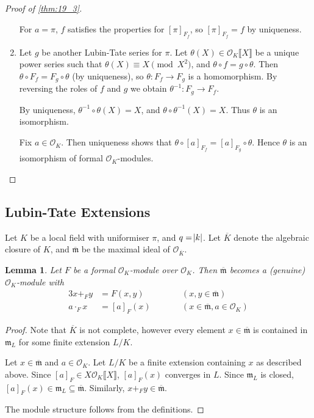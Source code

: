 \documentclass[11pt]{article}
\theoremstyle{definition}
\theoremstyle{plain}
\newtheorem{lemma}[definition]{Lemma}
\theoremstyle{remark}
\newcommand{\cO}{\mathcal{O}}
\newcommand{\fm}{\mathfrak{m}}
\begin{document}
\begin{proof}[Proof of \autoref{thm:19_3}]
\begin{enumerate}
            For $a = \pi$, $f$ satisfies the properties for $[\pi]_{F_f}$, so $[\pi]_{F_f} = f$ by uniqueness.

        \item Let $g$ be another Lubin-Tate series for $\pi$. Let $\theta(X) \in \cO_K\llbracket X \rrbracket$ be a unique power series such that $\theta(X) \equiv X \pmod{X^2}$, and $\theta \circ f = g \circ \theta$. Then $\theta \circ F_f = F_g \circ \theta$ (by uniqueness), so $\theta : F_f \to F_g$ is a homomorphism. By reversing the roles of $f$ and $g$ we obtain $\theta^{-1} : F_g \to F_f$.

            By uniqueness, $\theta^{-1} \circ \theta(X) = X$, and $\theta \circ \theta^{-1}(X) = X$. Thus $\theta$ is an isomorphism.

            Fix $a \in \cO_K$. Then uniqueness shows that $\theta \circ [a]_{F_f} = [a]_{F_g} \circ \theta$. Hence $\theta$ is an isomorphism of formal $\cO_K$-modules. \qedhere
    \end{enumerate}
\end{proof}

\subsection{Lubin-Tate Extensions}
Let $K$ be a local field with uniformiser $\pi$, and $q = \abs{k}$. Let $\overline{K}$ denote the algebraic closure of $K$, and $\overline{\fm}$ be the maximal ideal of $\cO_{\overline{K}}$.

\begin{lemma}\label{lem:20_1}
    Let $F$ be a formal $\cO_K$-module over $\cO_K$. Then $\overline{\fm}$ becomes a (genuine) $\cO_K$-module with
    \begin{alignat*}{3}
        x +_F y &= F(x, y) &&\qquad (x, y \in \overline{\fm})\\
        a \cdot_F x &= [a]_F(x) &&\qquad (x \in \overline{\fm}, a \in \cO_K)
    \end{alignat*}
\end{lemma}
\begin{proof}
    Note that $\overline{K}$ is not complete, however every element $x \in \overline{\fm}$ is contained in $\fm_L$ for some finite extension $L/K$.

    Let $x \in \overline{\fm}$ and $a \in \cO_K$. Let $L/K$ be a finite extension containing $x$ as described above. Since $[a]_F \in X \cO_K \llbracket X \rrbracket$, $[a]_{F}(x)$ converges in $L$. Since $\fm_L$ is closed, $[a]_{F}(x) \in \fm_L \subseteq \overline{\fm}$. Similarly, $x +_F y \in \overline{\fm}$.

    The module structure follows from the definitions.
\end{proof}
\end{document}
